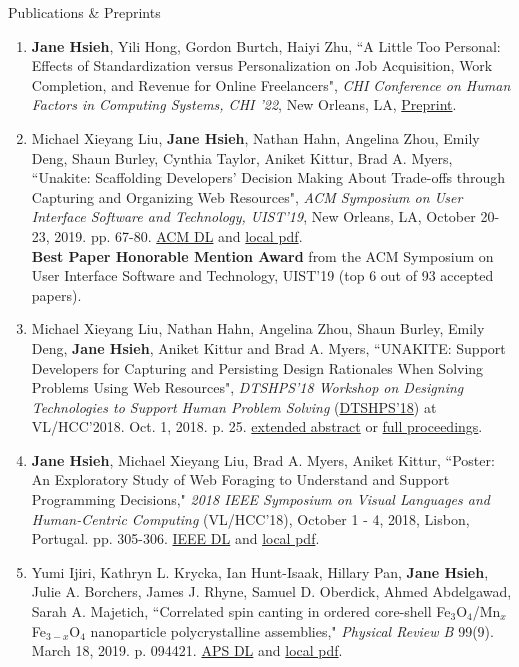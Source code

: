 \documentclass{resume}
\begin{document}
\begin{rSection}{Publications \& Preprints}
\begin{enumerate}
    \item \textbf{Jane Hsieh}, Yili Hong, Gordon Burtch, Haiyi Zhu, ``A Little Too Personal: Effects of Standardization versus Personalization on Job Acquisition, Work Completion, and Revenue for Online Freelancers", \textit{CHI Conference on Human Factors in Computing Systems, CHI ’22}, New Orleans, LA, \href{https://janeon.github.io/assets/chi22.pdf}{Preprint}.
    \item Michael Xieyang Liu, \textbf{Jane Hsieh}, Nathan Hahn, Angelina Zhou, Emily Deng, Shaun Burley, Cynthia Taylor, Aniket Kittur, Brad A. Myers, ``Unakite: Scaffolding Developers’ Decision Making About Trade-offs through Capturing and Organizing Web Resources", \textit{ACM Symposium on User Interface Software and Technology, UIST'19}, New Orleans, LA, October 20-23, 2019. pp. 67-80. \href{https://dl.acm.org/citation.cfm?id=3347908}{ACM DL} and \href{http://www.cs.cmu.edu/~NatProg/papers/p67-liu-Unakite-UIST.pdf}{local pdf}.\\
    \textbf{Best Paper Honorable Mention Award} from the ACM Symposium on User Interface Software and Technology, UIST'19 (top 6 out of 93 accepted papers). 
    \item Michael Xieyang Liu, Nathan Hahn, Angelina Zhou, Shaun Burley, Emily Deng, \textbf{Jane Hsieh}, Aniket Kittur and Brad A. Myers, ``UNAKITE: Support Developers for Capturing and Persisting Design Rationales When Solving Problems Using Web Resources", \textit{DTSHPS'18 Workshop on Designing Technologies to Support Human Problem Solving} (\href{https://www.cs.washington.edu/dtshps2018/index.html}{DTSHPS'18}) at VL/HCC'2018. Oct. 1, 2018. p. 25. \href{\myurl}{extended abstract} or \href{\myurl2}{full proceedings}.
    \item \textbf{Jane Hsieh}, Michael Xieyang Liu, Brad A. Myers, Aniket Kittur, ``Poster: An Exploratory Study of Web Foraging to Understand and Support Programming Decisions," \textit{2018 IEEE Symposium on Visual Languages and Human-Centric Computing} (VL/HCC'18), October 1 - 4, 2018, Lisbon, Portugal. pp. 305-306. \href{https://ieeexplore.ieee.org/document/8506517}{IEEE DL} and \href{http://www.cs.cmu.edu/~NatProg/papers/p305-hsieh.pdf}{local pdf}.
    \item Yumi Ijiri, Kathryn L. Krycka, Ian Hunt-Isaak, Hillary Pan, \textbf{Jane Hsieh}, Julie A. Borchers, James J. Rhyne, Samuel D. Oberdick, Ahmed Abdelgawad, Sarah A. Majetich, ``Correlated spin canting in ordered core-shell Fe$_3$O$_4$/Mn$_x$Fe$_{3-x}$O$_4$ nanoparticle polycrystalline assemblies," \textit{Physical Review B} 99(9). March 18, 2019. p. 094421. \href{https://journals.aps.org/prb/abstract/10.1103/PhysRevB.99.094421}{APS DL} and \href{https://janeon.github.io/assets/img/PhysRevB.99.094421.pdf}{local pdf}.

\end{enumerate}
\end{rSection}
\end{document}
